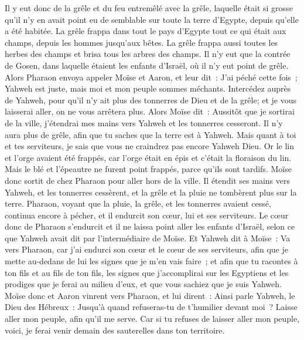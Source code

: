 \begin{multicols}{2}
Il y eut donc de la grêle et du feu entremêlé avec la grêle, laquelle était si grosse qu'il n'y en avait point eu de semblable sur toute la terre d'Egypte, depuis qu'elle a été habitée.
La grêle frappa dans tout le pays d'Egypte tout ce qui était aux champs, depuis les hommes jusqu'aux bêtes. La grêle frappa aussi toutes les herbes des champs et brisa tous les arbres des champs.
Il n'y eut que la contrée de Gosen, dans laquelle étaient les enfants d'Israël, où il n'y eut point de grêle.
Alors Pharaon envoya appeler Moïse et Aaron, et leur dit~: J'ai péché cette fois~; Yahweh est juste, mais moi et mon peuple sommes méchants.
Intercédez auprès de Yahweh, pour qu'il n'y ait plus des tonnerres de Dieu et de la grêle; et je vous laisserai aller, on ne vous arrêtera plus.
Alors Moïse dit~: Aussitôt que je sortirai de la ville, j'étendrai mes mains vers Yahweh et les tonnerres cesseront. Il n'y aura plus de grêle, afin que tu saches que la terre est à Yahweh.
Mais quant à toi et tes serviteurs, je sais que vous ne craindrez pas encore Yahweh Dieu.
Or le lin et l'orge avaient été frappés, car l'orge était en épis et c'était la floraison du lin.
 Mais le blé et l'épeautre ne furent point frappés, parce qu'ils sont tardifs.
Moïse donc sortit de chez Pharaon pour aller hors de la ville. Il étendit ses mains vers Yahweh, et les tonnerres cessèrent, et la grêle et la pluie ne tombèrent plus sur la terre.
Pharaon, voyant que la pluie, la grêle, et les tonnerres avaient cessé, continua encore à pécher, et il endurcit son cœur, lui et ses serviteurs.
Le cœur donc de Pharaon s'endurcit et il ne laissa point aller les enfants d'Israël, selon ce que Yahweh avait dit par l'intermédiaire de Moïse.
\VerseOne{} Et Yahweh dit à Moïse~: Va vers Pharaon, car j'ai endurci son cœur et le cœur de ses serviteurs, afin que je mette au-dedans de lui les signes que je m'en vais faire~;
et afin que tu racontes à ton fils et au fils de ton fils, les signes que j'accomplirai sur les Egyptiens et les prodiges que je ferai au milieu d'eux, et que vous sachiez que je suis Yahweh.
Moïse donc et Aaron vinrent vers Pharaon, et lui dirent~: Ainsi parle Yahweh, le Dieu des Hébreux~: Jusqu'à quand refuseras-tu de t'humilier devant moi~? Laisse aller mon peuple, afin qu'il me serve.
Car si tu refuses de laisser aller mon peuple, voici, je ferai venir demain des sauterelles dans ton territoire.

\end{multicols}
